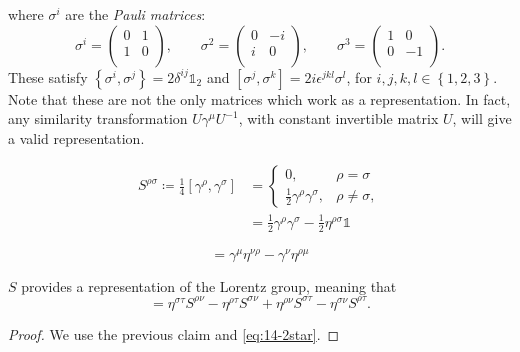 where $\sigma^i$ are the \emph{Pauli matrices}:
\begin{equation}
  \sigma^i = 
  \begin{pmatrix}
   0 & 1 \\
   1 & 0 \\
  \end{pmatrix}, \qquad
  \sigma^2 =
  \begin{pmatrix}
   0 & -i \\
   i & 0 \\
  \end{pmatrix},
  \qquad \sigma^3 = 
  \begin{pmatrix}
   1 & 0 \\
   0 & -1 \\
  \end{pmatrix}.
\end{equation}
These satisfy $\left\{ \sigma^i, \sigma^j\right\} = 2 \delta^{ij} \mathbb{1}_2$ and $\left[ \sigma^j, \sigma^k \right] = 2 i \epsilon^{jkl} \sigma^l$, for $i,j,k,l \in \left\{ 1, 2,3 \right\}$.
Note that these are not the only matrices which work as a representation. In fact, any similarity transformation $U \gamma^{\mu} U^{-1}$, with constant invertible matrix $U$, will give a valid representation.

\begin{definition}[]
  \begin{align}
    S^{\rho\sigma} \coloneqq \frac{1}{4} [\gamma^{\rho}, \gamma^{\sigma}] &=
    \begin{cases}
      0, & \rho = \sigma \\
      \frac{1}{2} \gamma^{\rho} \gamma^{\sigma}, & \rho \neq \sigma,
    \end{cases} \\
									  &=\frac{1}{2} \gamma^{\rho} \gamma^{\sigma} - \frac{1}{2} \eta^{\rho\sigma} \mathbb{1} \label{eq:14-2star}
  \end{align}
\end{definition}

\begin{claim}
  \begin{equation}
    [S^{\mu\nu}, \gamma^{\rho}] = \gamma^{\mu}\eta^{\nu\rho} - \gamma^{\nu} \eta^{\rho\mu}
  \end{equation}
\end{claim}
\begin{claim}
  $S$ provides a representation of the Lorentz group, meaning that
  \begin{equation}
    [S^{\rho\sigma}, S^{\tau\nu}] = \eta^{\sigma\tau} S^{\rho\nu} - \eta^{\rho\tau} S^{\sigma\nu} + \eta^{\rho\nu} S^{\sigma\tau}- \eta^{\sigma\nu} S^{\rho\tau}.
  \end{equation}
\end{claim}
\begin{proof}
  We use the previous claim and \eqref{eq:14-2star}.
\end{proof}

